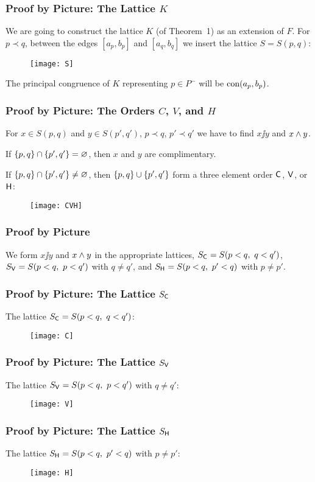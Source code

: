 \documentclass[leqno]{beamer}
\begin{document}
\begin{frame}
\frametitle{Proof by Picture: The Lattice $K$}
We are going to construct the lattice $K$ (of Theorem~1)
as an extension of $F$. 
For $p \prec q$, between the edges $[a_p, b_p]$ and $[a_q, b_q]$
we insert the lattice $S = S(p, q)$:


\begin{figure}[hbt]
\centerline{\texttt{[image: S]}}\label{F:S}
\end{figure}

The principal congruence of $K$ representing $p \in P^-$ 
will be $\textup{con}(a_p, b_p)$.


\end{frame}

\begin{frame}
\frametitle{Proof by Picture: The Orders $C$, $V$, and $H$}
For $x \in S(p, q)$ and $y \in S(p', q')$, $p \prec q$,  $p' \prec q'$
we have to find
$x \jj y$ and $x \mm y$. 

If $\{p, q\} \cap \{p', q'\} = \varnothing$, then $x$ and $y$
are complimentary.

If $\{p, q\} \cap \{p', q'\} \neq \varnothing$, then 
$\{p, q\} \cup \{p', q'\}$ form a three element order
$\mathsf{C}_{}$, $\mathsf{V}_{}$, or $\mathsf{H}_{}$:

\begin{figure}[p]
\centerline{\texttt{[image: CVH]}}
\end{figure}
\end{frame}

\begin{frame}
\frametitle{Proof by Picture}

We form $x \jj y$ and $x \mm y$ in the appropriate lattices, 
$S_{\mathsf{C}_{}} = S(p < q,\ q < q')$,
$S_{\mathsf{V}_{}} = S(p < q,\ p < q')$ with $q \neq q'$, and
$S_{\mathsf{H}_{}} = S(p < q,\ p' < q)$ with $p \neq p'$.
\end{frame}

\begin{frame}
\frametitle{Proof by Picture: The Lattice $S_{\mathsf{C}_{}}$}
The lattice $S_{\mathsf{C}_{}} = S(p < q,\ q < q')$:
\begin{figure}[p]
\centerline{\texttt{[image: C]}}
\end{figure}

\end{frame}


\begin{frame}
\frametitle{Proof by Picture: The Lattice $S_{\mathsf{V}_{}}$}
The lattice $S_{\mathsf{V}_{}} = S(p < q,\ p < q')$ with $q \neq q'$:
\begin{figure}
\centerline{\texttt{[image: V]}}
\end{figure}

\end{frame}

\begin{frame}
\frametitle{Proof by Picture: The Lattice $S_{\mathsf{H}_{}}$}
The lattice $S_{\mathsf{H}_{}} = S(p < q,\ p' < q)$ with $p \neq p'$:
\begin{figure}
\centerline{\texttt{[image: H]}}
\end{figure}

\end{frame}
\end{document}
